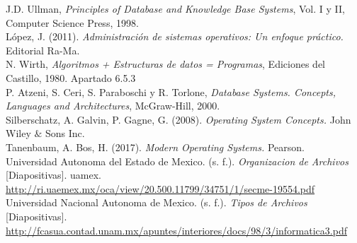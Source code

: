 \documentclass[11pt, twocolumn]{article}
\begin{document}
  J.D. Ullman, \textit{Principles of Database and Knowledge Base Systems}, Vol. I y II, Computer Science Press, 1998. \\

  López, J. (2011). \textit{Administración de sistemas operativos: Un enfoque práctico.} Editorial Ra-Ma. \\

  N. Wirth, \textit{Algoritmos + Estructuras de datos = Programas}, Ediciones del Castillo, 1980. Apartado 6.5.3 \\

  P. Atzeni, S. Ceri, S. Paraboschi y R. Torlone, \textit{Database Systems. Concepts, Languages and Architectures}, McGraw-Hill, 2000. \\

  Silberschatz, A. Galvin, P. Gagne, G. (2008). \textit{Operating System Concepts.} John Wiley $\&$ Sons Inc. \\

  Tanenbaum, A. Bos, H. (2017). \textit{Modern Operating Systems.} Pearson. \\

  Universidad Autonoma del Estado de Mexico. (s. f.). \textit{Organizacion de Archivos} [Diapositivas]. uamex. \url{http://ri.uaemex.mx/oca/view/20.500.11799/34751/1/secme-19554.pdf} \\

  Universidad Nacional Autonoma de Mexico. (s. f.). \textit{Tipos de Archivos} [Diapositivas]. \url{http://fcasua.contad.unam.mx/apuntes/interiores/docs/98/3/informatica3.pdf} \\
\end{document}
